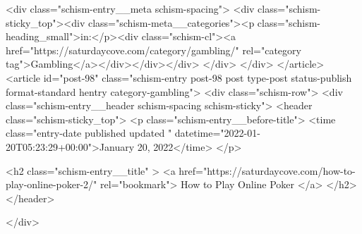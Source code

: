 {		<div class="schism-entry__meta schism-spacing">			<div class="schism-sticky_top"><div class="schism-meta__categories"><p class="schism-heading_small">in:</p><div class="schism-cl"><a href="https://saturdaycove.com/category/gambling/" rel="category tag">Gambling</a></div></div></div>		</div>
	</div>
</article>
<article id="post-98" class="schism-entry post-98 post type-post status-publish format-standard hentry category-gambling">
	<div class="schism-row">		<div class="schism-entry__header schism-spacing schism-sticky">			<header class="schism-sticky_top">				<p class="schism-entry__before-title">
					<time class="entry-date published updated " datetime="2022-01-20T05:23:29+00:00">January 20, 2022</time>				</p>

				<h2 class="schism-entry__title" >
					<a href="https://saturdaycove.com/how-to-play-online-poker-2/" rel="bookmark">
						How to Play Online Poker					</a>
				</h2>
			</header>

					</div>

}
